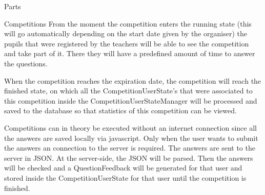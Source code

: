 \documentclass[]{article}
\begin{document}
\begin{section}{Parts}
\begin{subsection}{Competitions}
        From the moment the competition enters the running state (this will go
        automatically depending on the start date given by the organiser) the pupils
        that were registered by the teachers will be able to see the competition and
        take part of it. There they will have a predefined amount of time to answer
        the questions.
        
        When the competition reaches the expiration date, the competition will reach the
        finished state, on which all the CompetitionUserState's that were associated to
        this competition inside the CompetitionUserStateManager will be processed and
        saved to the database so that statistics of this competition can be viewed.
        
        Competitions can in theory be executed without an internet connection since
        all the answers are saved locally via javascript. Only when the user wants to submit
        the answers an connection to the server is required. The answers are sent to the
        server in JSON. At the server-side, the JSON will be parsed. Then the answers will
        be checked and a QuestionFeedback will be generated for that user and stored inside
        the CompetitionUserState for that user until the competition is finished.
        

\end{subsection}
\end{section}
\end{document}
